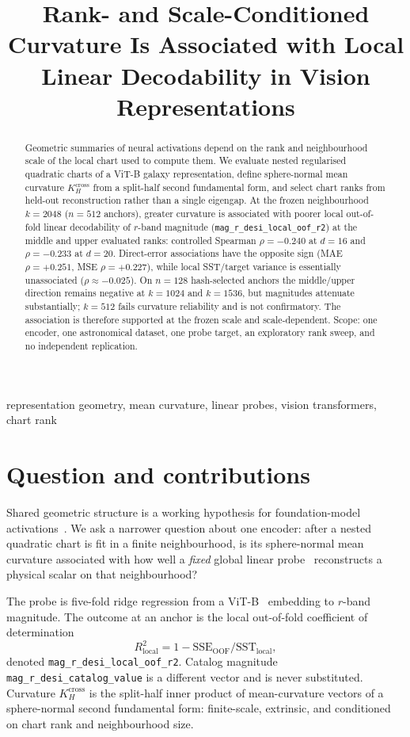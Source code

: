 \documentclass[mlabstract]{jmlr}
\title[Curvature and local decodability]{Rank- and Scale-Conditioned Curvature Is Associated with Local Linear Decodability in Vision Representations}
\begin{document}
\maketitle

\begin{abstract}
Geometric summaries of neural activations depend on the rank and neighbourhood scale of the local chart used to compute them. We evaluate nested regularised quadratic charts of a ViT-B galaxy representation, define sphere-normal mean curvature $K_{H}^{\mathrm{cross}}$ from a split-half second fundamental form, and select chart ranks from held-out reconstruction rather than a single eigengap. At the frozen neighbourhood $k{=}2048$ ($n{=}512$ anchors), greater curvature is associated with poorer local out-of-fold linear decodability of $r$-band magnitude (\texttt{mag\_r\_desi\_local\_oof\_r2}) at the middle and upper evaluated ranks: controlled Spearman $\rho{=}-0.240$ at $d{=}16$ and $\rho{=}-0.233$ at $d{=}20$. Direct-error associations have the opposite sign (MAE $\rho{=}+0.251$, MSE $\rho{=}+0.227$), while local SST/target variance is essentially unassociated ($\rho{\approx}-0.025$). On $n{=}128$ hash-selected anchors the middle/upper direction remains negative at $k{=}1024$ and $k{=}1536$, but magnitudes attenuate substantially; $k{=}512$ fails curvature reliability and is not confirmatory. The association is therefore supported at the frozen scale and scale-dependent. Scope: one encoder, one astronomical dataset, one probe target, an exploratory rank sweep, and no independent replication.
\end{abstract}
\begin{keywords}
representation geometry, mean curvature, linear probes, vision transformers, chart rank
\end{keywords}

\section{Question and contributions}
\label{sec:intro}

Shared geometric structure is a working hypothesis for foundation-model activations~\citep{huh2024platonic,duraphe2025platonicuniverse}. We ask a narrower question about one encoder: after a nested quadratic chart is fit in a finite neighbourhood, is its sphere-normal mean curvature associated with how well a \emph{fixed} global linear probe~\citep{alain2017probes} reconstructs a physical scalar on that neighbourhood?

The probe is five-fold ridge regression from a ViT-B~\citep{dosovitskiy2021vit} embedding to $r$-band magnitude. The outcome at an anchor is the local out-of-fold coefficient of determination
\[
R^{2}_{\mathrm{local}}=1-\mathrm{SSE}_{\mathrm{OOF}}/\mathrm{SST}_{\mathrm{local}},
\]
denoted \texttt{mag\_r\_desi\_local\_oof\_r2}. Catalog magnitude \texttt{mag\_r\_desi\_catalog\_value} is a different vector and is never substituted. Curvature $K_{H}^{\mathrm{cross}}$ is the split-half inner product of mean-curvature vectors of a sphere-normal second fundamental form: finite-scale, extrinsic, and conditioned on chart rank and neighbourhood size.
\end{document}
